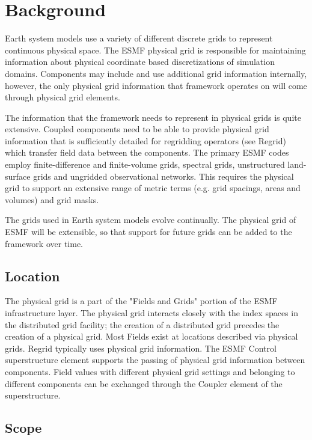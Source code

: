 
\section{Background}


  Earth system models use a variety of different discrete grids to represent
continuous physical space. The ESMF physical grid is 
responsible for maintaining information about physical coordinate based 
discretizations of simulation domains. Components may include and use 
additional grid information internally, however, the only physical grid 
information that framework operates on will come through physical grid elements. 

  The information that the framework needs to represent in physical grids is quite
extensive. Coupled components need to be able to provide physical grid information
that is sufficiently detailed for regridding operators (see Regrid) which
transfer field data between the components.  The primary ESMF codes employ
finite-difference and finite-volume grids, spectral grids, unstructured
land-surface grids and ungridded observational networks.  This requires the
physical grid to support an extensive range of metric terms (e.g. grid spacings,
areas and volumes) and grid masks.

 The grids used in Earth system models evolve continually. The physical grid
of ESMF will be extensible, so that support for future
grids can be added to the framework over time.

\subsection{Location}

  The physical grid is a part of the "Fields and Grids" portion of the ESMF
infrastructure layer. The physical grid interacts closely with the index spaces in the 
distributed grid facility; the creation of a distributed grid precedes the 
creation of a physical grid.  Most Fields exist at locations described via physical grids.  
Regrid typically uses physical grid information. The ESMF Control
superstructure element supports the passing of physical grid information between
components. Field values with different physical grid settings and belonging
to different components can be exchanged through the Coupler element of the 
superstructure.

\subsection{Scope}

